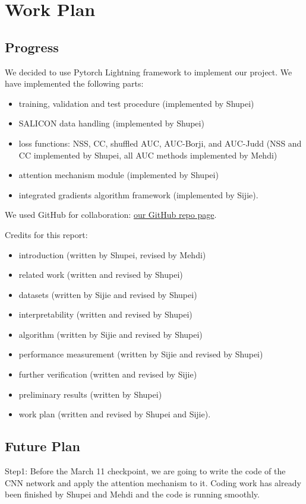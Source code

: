 \documentclass[12pt]{article}
\begin{document}
\section{Work Plan}
\subsection{Progress}
We decided to use Pytorch Lightning framework \cite{falcon2019pytorch} to implement our project.
We have implemented the following parts:
\begin{itemize}
    \item training, validation and test procedure (implemented by Shupei)
    \item SALICON data handling (implemented by Shupei)
    \item loss functions: NSS, CC, shuffled AUC, AUC-Borji, and AUC-Judd (NSS and CC implemented by Shupei, all AUC methods implemented by Mehdi)
    \item attention mechanism module (implemented by Shupei)
    \item integrated gradients algorithm framework (implemented by Sijie).
\end{itemize}
We used GitHub for collaboration: \href{https://github.com/Freddiechang/CMPUT566}{our GitHub repo page}.

Credits for this report:
\begin{itemize}
    \item introduction (written by Shupei, revised by Mehdi)
    \item related work (written and revised by Shupei)
    \item datasets (written by Sijie and revised by Shupei)
    \item interpretability (written and revised by Shupei)
    \item algorithm (written by Sijie and revised by Shupei)
    \item performance measurement (written by Sijie and revised by Shupei)
    \item further verification (written and revised by Sijie)
    \item preliminary results (written by Shupei)
    \item work plan (written and revised by Shupei and Sijie).
\end{itemize}

\subsection{Future Plan}
Step1: Before the March 11 checkpoint, we are going to write the code of the CNN network and apply the attention mechanism to it. Coding work has already been finished by Shupei and Mehdi and the code is running smoothly.
\end{document}
